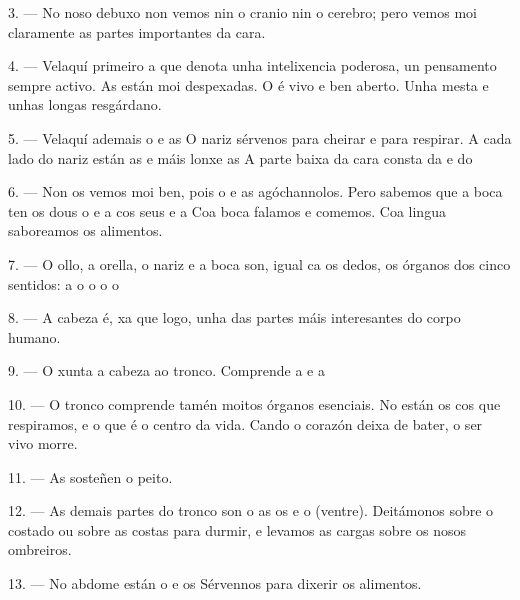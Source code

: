 3. --- No noso debuxo non vemos nin o cranio nin o cerebro; pero vemos moi claramente
as partes importantes da cara.

4. --- Velaquí primeiro a  que denota unha intelixencia poderosa,
un pensamento sempre activo. As  están moi despexadas. O 
é vivo e ben aberto. Unha  mesta e unhas  longas
resgárdano.

5. --- Velaquí ademais o  e as  O nariz sérvenos para
cheirar e para respirar. A cada lado do nariz están as  e máis
lonxe as  A parte baixa da cara consta da  e do

6. --- Non os vemos moi ben, pois o  e as 
agóchannolos. Pero sabemos que a boca ten os dous  o 
e a  cos seus  e a  Coa boca
falamos e comemos. Coa lingua saboreamos os alimentos.

7. --- O ollo, a orella, o nariz e a boca son, igual ca os dedos, os órganos dos
cinco sentidos: a  o  o  o
 o 

8. --- A cabeza é, xa que logo, unha das partes máis interesantes do corpo humano.

\VUsaut{4.4mm}
\VUsaut{3.0mm}

9. --- O  xunta a cabeza ao tronco. Comprende a  e a

10. --- O tronco comprende tamén moitos órganos esenciais. No  están
os  cos que respiramos, e o  que é o centro da
vida. Cando o corazón deixa de bater, o ser vivo morre.

11. --- As  sosteñen o peito.

12. --- As demais partes do tronco son o  as  os
 e o  (ventre). Deitámonos sobre o costado ou sobre
as costas para durmir, e levamos as cargas sobre os nosos ombreiros.

13. --- No abdome están o  e os  Sérvennos para
dixerir os alimentos.


